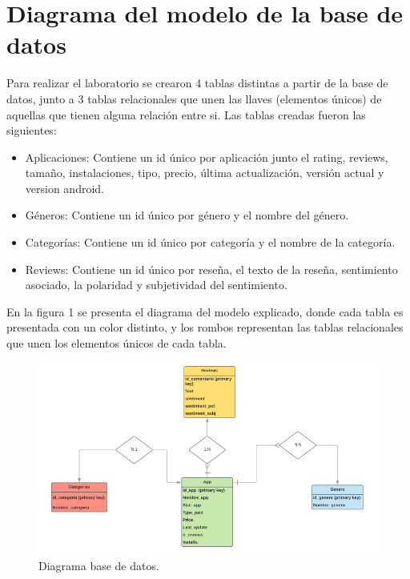 \documentclass{article}
\begin{document}
\section*{Diagrama del modelo de la base de datos}
Para realizar el laboratorio se crearon 4 tablas distintas a partir de la base de datos, junto a 3 tablas relacionales que unen las llaves (elementos únicos) de aquellas que tienen alguna relación entre si. 
Las tablas creadas fueron las siguientes:
\begin{itemize}
    \item Aplicaciones: Contiene un id único por aplicación junto el rating, reviews, tamaño, instalaciones, tipo, precio, última actualización, versión actual y version android. 
    \item Géneros: Contiene un id único por género y el nombre del género. 
    \item Categorías: Contiene un id único por categoría y el nombre de la categoría. 
    \item Reviews: Contiene un id único por reseña, el texto de la reseña, sentimiento asociado, la polaridad y subjetividad del sentimiento.
\end{itemize}
En la figura 1 se presenta el diagrama del modelo explicado, donde cada tabla es presentada con un color distinto, y los rombos representan las tablas relacionales que unen los elementos únicos de cada tabla. 
\begin{figure}[h]
\centering
\includegraphics[width=1.2\textwidth]{Modelo.PNG}
\caption{\footnotesize{Diagrama base de datos.}}
\end{figure}
\end{document}
